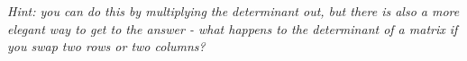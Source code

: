\begin{questions}
\begin{parts}
					\emph{Hint: you can do this by multiplying the determinant out, but there is also a more elegant way to get to the answer - what happens to the determinant of a matrix if you swap two rows or two columns?}
					
						\begin{solution}[3in]
						\end{solution}
				
			\end{parts}
	
\end{questions}

\stophere
